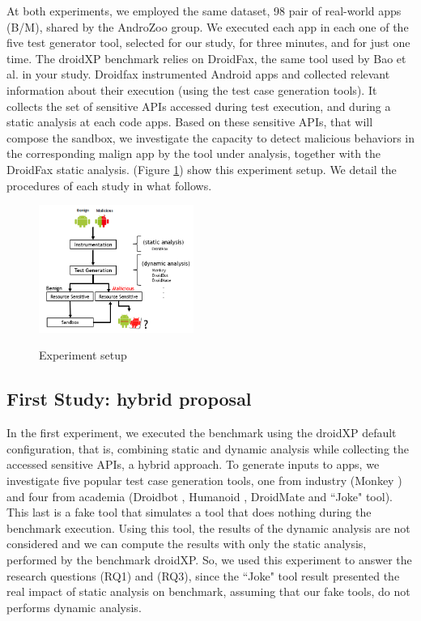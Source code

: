 At both experiments, we employed the same dataset, 98 pair of real-world apps (B/M), shared by the AndroZoo \cite{DBLP:conf/msr/AllixBKT16} group. We executed each app in each one of the five test generator tool, selected for our study, for three minutes, and for just one time. The droidXP benchmark relies on DroidFax, the same tool used by Bao et al. in your study. Droidfax instrumented Android apps and collected relevant information about their execution (using the test case generation tools). It collects the set of sensitive APIs accessed during test execution, and during a static analysis at each code apps. Based on these sensitive APIs, that will compose the sandbox, we investigate the capacity to detect malicious behaviors in the corresponding malign app by the tool under analysis, together with the DroidFax static analysis. (Figure \ref{fig:setup}) show this experiment setup. We detail the procedures of each study in what follows.

\begin{figure}[h]
  \includegraphics[width=0.45\textwidth]{images/setup.png}
  \label{Experiment setup}
  \caption{Experiment setup}
  \label{fig:setup}
\end{figure}

\subsection{First Study: hybrid proposal}

In the first experiment, we executed the benchmark using the droidXP default configuration, that is, combining static and dynamic analysis while collecting the accessed sensitive APIs, a hybrid approach. To generate inputs to apps, we investigate five popular test case generation tools, one from industry (Monkey \cite{Monkey}) and four from academia (Droidbot \cite{DBLP:conf/icse/LiYGC17}, Humanoid \cite{DBLP:conf/kbse/LiY0C19}, DroidMate \cite{DBLP:conf/icse/JamrozikZ16} and ``Joke" tool). This last is a fake tool that simulates a tool that does nothing during the benchmark execution. Using this tool, the results of the dynamic analysis are not considered and we can compute the results with only the static analysis, performed by the benchmark droidXP. So, we used this experiment to answer the research questions (RQ1) and (RQ3), since the ``Joke" tool result presented the real impact of static analysis on benchmark, assuming that our fake tools, do not performs dynamic analysis.

